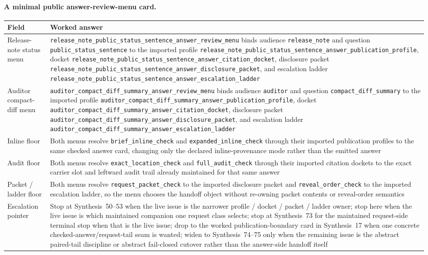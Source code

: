 \documentclass[11pt]{article}
\begin{document}
\paragraph{A minimal public answer-review-menu card.}
\begin{table}[t]
\centering
\small
\begin{tabularx}{\linewidth}{@{}lX@{}}
\toprule
Field & Worked answer \\
\midrule
Release-note status menu & \nolinkurl{release_note_public_status_sentence_answer_review_menu} binds audience \texttt{release\_note} and question \texttt{public\_status\_sentence} to the imported profile \nolinkurl{release_note_public_status_sentence_answer_publication_profile}, docket \nolinkurl{release_note_public_status_sentence_answer_citation_docket}, disclosure packet \nolinkurl{release_note_public_status_sentence_answer_disclosure_packet}, and escalation ladder \nolinkurl{release_note_public_status_sentence_answer_escalation_ladder} \\
Auditor compact-diff menu & \nolinkurl{auditor_compact_diff_summary_answer_review_menu} binds audience \texttt{auditor} and question \texttt{compact\_diff\_summary} to the imported profile \nolinkurl{auditor_compact_diff_summary_answer_publication_profile}, docket \nolinkurl{auditor_compact_diff_summary_answer_citation_docket}, disclosure packet \nolinkurl{auditor_compact_diff_summary_answer_disclosure_packet}, and escalation ladder \nolinkurl{auditor_compact_diff_summary_answer_escalation_ladder} \\
Inline floor & Both menus resolve \nolinkurl{brief_inline_check} and \nolinkurl{expanded_inline_check} through their imported publication profiles to the same checked answer card, changing only the declared inline-provenance mode rather than the emitted answer \\
Audit floor & Both menus resolve \nolinkurl{exact_location_check} and \nolinkurl{full_audit_check} through their imported citation dockets to the exact carrier slot and leftward audit trail already maintained for that same answer \\
Packet / ladder floor & Both menus resolve \nolinkurl{request_packet_check} to the imported disclosure packet and \nolinkurl{reveal_order_check} to the imported escalation ladder, so the menu chooses the handoff object without re-owning packet contents or reveal-order semantics \\
Escalation pointer & Stop at Synthesis~50--53 when the live issue is the narrower profile / docket / packet / ladder owner; stop here when the live issue is which maintained companion one request class selects; stop at Synthesis~73 for the maintained request-side terminal stop when that is the live issue; drop to the worked publication-boundary card in Synthesis~17 when one concrete checked-answer/request-tail seam is wanted; widen to Synthesis~74--75 only when the remaining issue is the abstract paired-tail discipline or abstract fail-closed cutover rather than the answer-side handoff itself \\

\end{tabularx}
\end{table}
\end{document}
